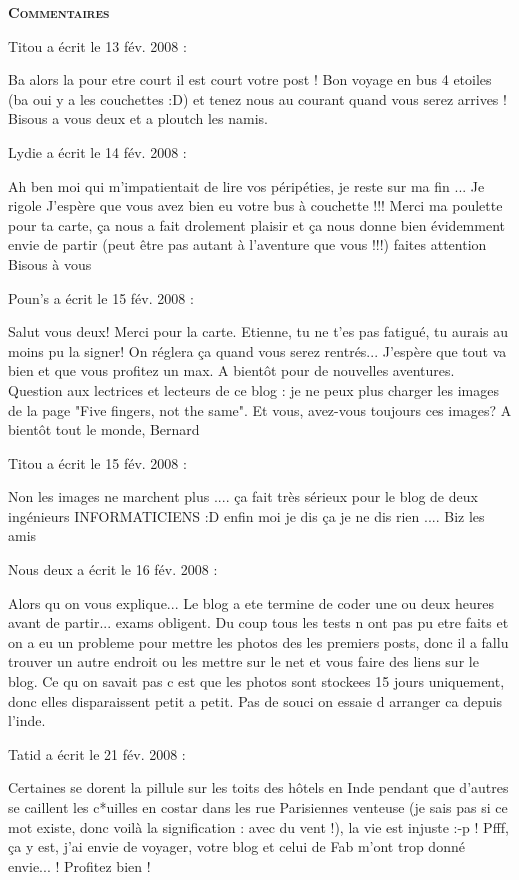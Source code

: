 \bigskip
\textbf{\textsc{Commentaires}}

\medskip
Titou a écrit le 13 fév. 2008 :
\begin{displayquote}
Ba alors la pour etre court il est court votre post ! Bon voyage en bus 4 etoiles (ba oui y a les couchettes :D) et tenez nous au courant quand vous serez arrives ! Bisous a vous deux et a ploutch les namis.
\end{displayquote}

\medskip
Lydie a écrit le 14 fév. 2008 :
\begin{displayquote}
Ah ben moi qui m'impatientait de lire vos péripéties, je reste sur ma fin ...
Je rigole
J'espère que vous avez bien eu votre bus à couchette !!!
Merci ma poulette pour ta carte, ça nous a fait drolement plaisir et ça nous donne bien évidemment envie de partir (peut être pas autant à l'aventure que vous !!!)
faites attention
Bisous à vous
\end{displayquote}

\medskip
Poun's a écrit le 15 fév. 2008 :
\begin{displayquote}
Salut vous deux! Merci pour la carte. Etienne, tu ne t'es pas fatigué, tu aurais au moins pu la signer! On réglera ça quand vous serez rentrés...
J'espère que tout va bien et que vous profitez un max.
A bientôt pour de nouvelles aventures.
Question aux lectrices et lecteurs de ce blog : je ne peux plus charger les images de la page "Five fingers, not the same". Et vous, avez-vous toujours ces images?
A bientôt tout le monde, Bernard
\end{displayquote}

\medskip
Titou a écrit le 15 fév. 2008 :
\begin{displayquote}
Non les images ne marchent plus .... ça fait très sérieux pour le blog de deux ingénieurs INFORMATICIENS :D enfin moi je dis ça je ne dis rien .... Biz les amis
\end{displayquote}

\medskip
Nous deux a écrit le 16 fév. 2008 :
\begin{displayquote}
Alors qu on vous explique...
Le blog a ete termine de coder une ou deux heures avant de partir... exams obligent. Du coup tous les tests n ont pas pu etre faits et on a eu un probleme pour mettre les photos des les premiers posts, donc il a fallu trouver un autre endroit ou les mettre sur le net et vous faire des liens sur le blog. Ce qu on savait pas c est que les photos sont stockees 15 jours uniquement, donc elles disparaissent petit a petit. Pas de souci on essaie d arranger ca depuis l'inde.
\end{displayquote}

\medskip
Tatid a écrit le 21 fév. 2008 :
\begin{displayquote}
Certaines se dorent la pillule sur les toits des hôtels en Inde pendant que d'autres se caillent les c*uilles en costar dans les rue Parisiennes venteuse (je sais pas si ce mot existe, donc voilà la signification : avec du vent !), la vie est injuste :-p !
Pfff, ça y est, j'ai envie de voyager, votre blog et celui de Fab m'ont trop donné envie... ! Profitez bien !
\end{displayquote}


